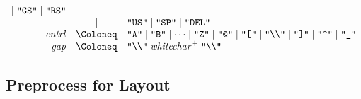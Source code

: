 \begin{align*}
\begin{array}{rcl}
    \mid \text{\texttt{\textquotedbl GS\textquotedbl}}
    \mid \text{\texttt{\textquotedbl RS\textquotedbl}}
    \\
    & \mid & \text{\texttt{\textquotedbl US\textquotedbl}}
    \mid \text{\texttt{\textquotedbl SP\textquotedbl}}
    \mid \text{\texttt{\textquotedbl DEL\textquotedbl}}
    \\
    \mathit{cntrl}
    & \Coloneq & \text{\texttt{\textquotedbl A\textquotedbl}} \mid \text{\texttt{\textquotedbl B\textquotedbl}} \mid \cdots \mid \text{\texttt{\textquotedbl Z\textquotedbl}}
    \mid \text{\texttt{\textquotedbl @\textquotedbl}}
    \mid \text{\texttt{\textquotedbl [\textquotedbl}}
    \mid \text{\texttt{\textquotedbl\textbackslash\textbackslash\textquotedbl}}
    \mid \text{\texttt{\textquotedbl ]\textquotedbl}}
    \mid \text{\texttt{\textquotedbl\textasciicircum\textquotedbl}}
    \mid \text{\texttt{\textquotedbl\textunderscore\textquotedbl}}
    \\
    \mathit{gap}
    & \Coloneq & \text{\texttt{\textquotedbl\textbackslash\textbackslash\textquotedbl}}\; \mathit{whitechar}^+\; \text{\texttt{\textquotedbl\textbackslash\textbackslash\textquotedbl}}
  \end{array}
\end{align*}

\subsection{Preprocess for Layout}

